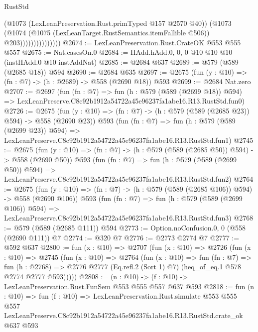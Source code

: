 \begin{lexlean}{RustStd}
\begin{coremodule}
                              (@1073 (LexLeanPreservation.Rust.primTyped @157 @2570 @40))
                              (@1073
                                (@1074
                                  (@1075 (LexLeanTarget.RustSemantics.itemFallible @506))
                                  @203)))))))))))))))
@2674 := LexLeanPreservation.Rust.CrateOK @553 @555 @557
@2675 := Nat.casesOn.{0}
@2684 := HAdd.hAdd.{0, 0, 0} @10 @10 @10 (instHAdd.{0} @10 instAddNat)
@2685 := @2684 @637
@2689 := @579 (@589 (@2685 @18)) @594
@2690 := @2684 @635
@2697 := @2675 (fun (y : @10) => (fn : @7) -> (h : @2689) -> @558 (@2690 @18)) @593
@2699 := @2684 Nat.zero
@2707 := @2697
    (fun (fn : @7) =>
    fun (h : @579 (@589 (@2699 @18)) @594) =>
    LexLeanPreserve.C8c92b1912a54722a45e96237fa1abe16.R13.RustStd.fun0)
@2726 := @2675
    (fun (y : @10) => (fn : @7) -> (h : @579 (@589 (@2685 @23)) @594) -> @558 (@2690 @23))
    @593
    (fun (fn : @7) =>
    fun (h : @579 (@589 (@2699 @23)) @594) =>
    LexLeanPreserve.C8c92b1912a54722a45e96237fa1abe16.R13.RustStd.fun1)
@2745 := @2675
    (fun (y : @10) => (fn : @7) -> (h : @579 (@589 (@2685 @50)) @594) -> @558 (@2690 @50))
    @593
    (fun (fn : @7) =>
    fun (h : @579 (@589 (@2699 @50)) @594) =>
    LexLeanPreserve.C8c92b1912a54722a45e96237fa1abe16.R13.RustStd.fun2)
@2764 := @2675
    (fun (y : @10) => (fn : @7) -> (h : @579 (@589 (@2685 @106)) @594) -> @558 (@2690 @106))
    @593
    (fun (fn : @7) =>
    fun (h : @579 (@589 (@2699 @106)) @594) =>
    LexLeanPreserve.C8c92b1912a54722a45e96237fa1abe16.R13.RustStd.fun3)
@2768 := @579 (@589 (@2685 @111)) @594
@2773 := Option.noConfusion.{0, 0} (@558 (@2690 @111)) @7
@2774 := @320 @7
@2776 := @2773 @2774 @7
@2777 := @592 @637
@2800 := fun (x : @10) =>
  @2707
    (fun (x : @10) =>
    @2726
      (fun (x : @10) =>
      @2745
        (fun (x : @10) =>
        @2764
          (fun (x : @10) =>
          fun (fn : @7) =>
          fun (h : @2768) =>
          @2776 @2777 (Eq.refl.{2} (Sort 1) @7) (heq_of_eq.{1} @578 @2774 @2777 @593)))))
@2808 := (n : @10) -> (f : @10) -> LexLeanPreservation.Rust.FunSem @553 @555 @557 @637 @593
@2818 := fun (n : @10) =>
  fun (f : @10) =>
  LexLeanPreservation.Rust.simulate
    @553
    @555
    @557
    LexLeanPreserve.C8c92b1912a54722a45e96237fa1abe16.R13.RustStd.crate_ok
    @637
    @593
\end{coremodule}
\end{lexlean}
